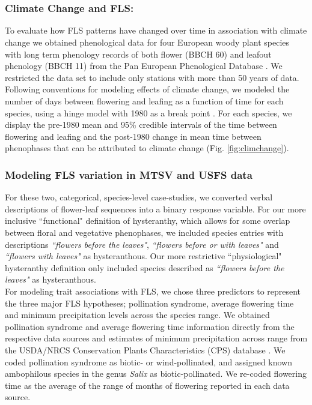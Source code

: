 \documentclass[11pt]{article}\usepackage[]{graphicx}\usepackage[]{color}
\begin{document}
\pagebreak[4]

\section*{}\label{Methods S1}

\subsubsection*{Climate Change and FLS:}
To evaluate how FLS patterns have changed over time in association with climate change we obtained phenological data for four European woody plant species with long term phenology records of both flower (BBCH 60) and leafout phenology (BBCH 11) from the Pan European Phenological Database \citep{PEP725}. We restricted the data set to include only stations with more than 50 years of data. Following conventions for modeling effects of climate change, we modeled the number of days between flowering and leafing as a function of time for each species, using a hinge model with 1980 as a break point \citep{IPCC2013,Kharouba2018}. For each species, we display the pre-1980 mean and 95\% credible intervals of the time between flowering and leafing and the post-1980 change in mean time between phenophases that can be  attributed to climate change (Fig. \ref{fig:climchange}).

\subsubsection*{Modeling FLS variation in MTSV and USFS data}
For these two, categorical, species-level case-studies, we converted verbal descriptions of flower-leaf sequences into a binary response variable. For our more inclusive ``functional" definition of hysteranthy, which allows for some overlap between floral and vegetative phenophases, we included species entries with descriptions \textit{``flowers before the leaves"}, \textit{``flowers before or with leaves"} and \textit{``flowers with leaves"} as hysteranthous. Our more restrictive ``physiological" hysteranthy definition only included species described as \textit{``flowers before the leaves"} as hysteranthous.\\

\noindent For modeling trait associations with FLS, we chose three predictors to represent the three major FLS hypotheses; pollination syndrome, average flowering time and minimum precipitation levels across the species range. We obtained pollination syndrome and average flowering time information directly from the respective data sources and estimates of minimum precipitation across range from the USDA/NRCS Conservation Plants Characteristics (CPS) database \citep{usdancrs}. We coded pollination syndrome as biotic- or wind-pollinated, and assigned known ambophilous species in the genus \textit{Salix} as biotic-pollinated. We re-coded flowering time as the average of the range of months of flowering reported in each data source.\\
\end{document}
